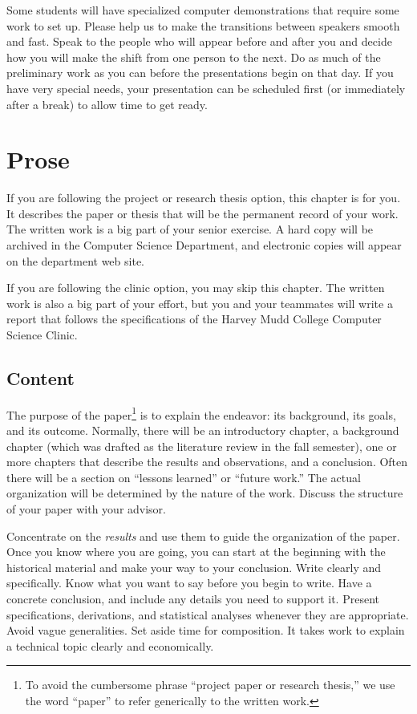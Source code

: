 \documentclass[finalcopy]{srpaper}
\begin{document}
Some students will have specialized computer demonstrations
that require some work to set up. Please help us to make the
transitions between speakers smooth and fast. Speak to the
people who will appear before and after you and decide how
you will make the shift from one person to the next. Do as
much of the preliminary work as you can before the
presentations begin on that day. If you have very special
needs, your presentation can be scheduled first (or
immediately after a break) to allow time to get ready.%


%
%
\chapter{Prose}
\label{Chapter:Prose}
If you are following the project or research thesis option,
this chapter is for you. It describes the paper or thesis
that will be the permanent record of your work. The written
work is a big part of your senior exercise. A hard copy will
be archived in the Computer Science Department, and
electronic copies will appear on the department web site.

If you are following the clinic option, you may skip this
chapter. The written work is also a big part of your effort,
but you and your teammates will write a report that follows
the specifications of the Harvey Mudd College Computer
Science Clinic.


\section{Content}
\label{Section:Content}
The purpose of the paper\footnote{To avoid the cumbersome
  phrase ``project paper or research thesis,'' we use the
  word ``paper'' to refer generically to the written work.}
is to explain the endeavor: its background, its goals, and
its outcome. Normally, there will be an introductory
chapter, a background chapter (which was drafted as the
literature review in the fall semester), one or more
chapters that describe the results and observations, and a
conclusion. Often there will be a section on ``lessons
learned'' or ``future work.'' The actual organization will
be determined by the nature of the work. Discuss the
structure of your paper with your
advisor.

Concentrate on the \emph{results} and use them to guide the
organization of the paper. Once you know where you are
going, you can start at the beginning with the historical
material and make your way to your conclusion. Write clearly
and specifically. Know what you want to say before you begin
to write. Have a concrete conclusion, and include any 
details you need to support it. Present specifications,
derivations, and statistical analyses whenever they are
appropriate. Avoid vague generalities. Set aside time
for composition. It takes work to explain a technical topic
clearly and economically.
\end{document}
